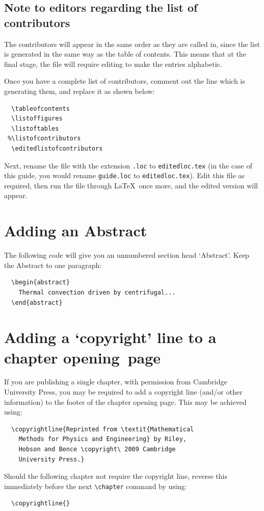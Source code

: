 \subsection{Note to editors regarding the list of contributors}

The contributors will appear in the same order as they are called in, since the list is generated in the same way as the table of contents. This means that at the final stage, the file will require editing to make the entries alphabetic.

Once you have a complete list of contributors, comment out the line which is generating them, and replace it as shown below:
\begin{verbatim}
  \tableofcontents
  \listoffigures
  \listoftables
 %\listofcontributors
  \editedlistofcontributors
\end{verbatim}
Next, rename the file with the extension \verb".loc" to \verb"editedloc.tex" (in the case of this guide, you would rename \texttt{\cambridge guide.loc} to \verb"editedloc.tex"). Edit this file as required, then run the file through \LaTeX\ once more, and the edited version will appear.

\section{Adding an Abstract}
The following code will give you an unnumbered section head `Abstract'. Keep the Abstract to one paragraph:
\begin{verbatim}
  \begin{abstract}
    Thermal convection driven by centrifugal...
  \end{abstract}
\end{verbatim}

\section{Adding a `copyright' line to a chapter opening~page}
If you are publishing a single chapter, with permission from Cambridge University Press, you may be required to add a copyright line (and/or other information) to the footer of the chapter opening page. This may be achieved using:
\begin{verbatim}
  \copyrightline{Reprinted from \textit{Mathematical
    Methods for Physics and Engineering} by Riley,
    Hobson and Bence \copyright\ 2009 Cambridge
    University Press.}
\end{verbatim}
Should the following chapter not require the copyright line, reverse this immediately before the next \verb"\chapter" command by using:
\begin{verbatim}
  \copyrightline{}
\end{verbatim}


